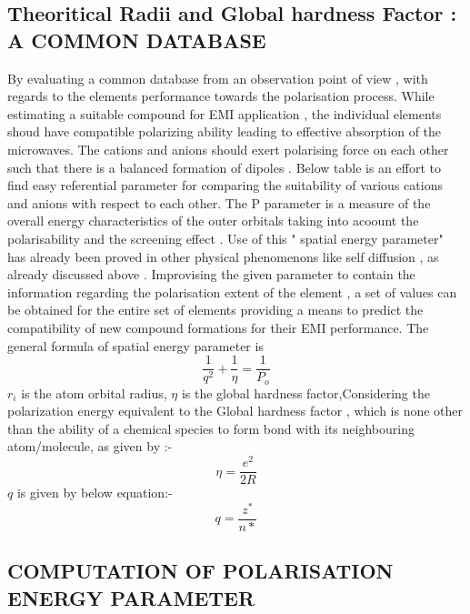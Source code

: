 \documentclass[journal]{IEEEtran}
\begin{document}
\subsection{Theoritical Radii and Global hardness Factor : A COMMON DATABASE}
By evaluating a common database from an observation point of view , with regards to the elements performance towards the polarisation process. While estimating a suitable compound for EMI application , the individual elements shoud have compatible polarizing ability leading to effective absorption of the microwaves. The cations and anions should exert polarising force on each other such that there is a balanced formation of dipoles \cite{JaiS} \cite{shannon}. Below table is an effort to find easy referential parameter for comparing the suitability of various cations and anions with respect to each other. The P parameter is a measure of the overall energy characteristics of the outer orbitals taking into acoount the polarisability and the screening effect \cite{dimitrov1999electronic}. Use of this " spatial energy parameter" has already been proved in other physical phenomenons like self diffusion , as already discussed above . Improvising the given parameter to contain the information regarding the polarisation extent of the element , a set of values can be obtained for the entire set of elements providing a means to predict the compatibility of new compound formations for their EMI performance. The general formula of spatial energy parameter is \cite{korablev2018calculations}
\begin{equation}
\dfrac{1}{{q^2}} + \dfrac{1}{\eta} = \dfrac{1}{P_o}
\end{equation}
$r_i$ is the atom orbital radius, $\eta$ is the global hardness factor,Considering the polarization energy equivalent to the Global hardness factor , which is none other than the ability of a chemical species to form bond with its neighbouring atom/molecule, as given by :-
\begin{equation}
\eta = \dfrac{e^2}{2 R}
\end{equation}
$q$ is given by below equation:-
\begin{equation}
		q = \dfrac{z^*}{n*}   
\end{equation}
\subsection{COMPUTATION OF POLARISATION ENERGY PARAMETER}
\end{document}
